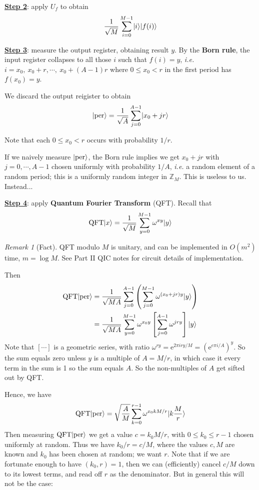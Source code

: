 \documentclass[]{article}
\DeclarePairedDelimiter\ket{\lvert}{\rangle}
\theoremstyle{custhm}
\theoremstyle{cusdef}
\theoremstyle{custhm}
\theoremstyle{custhm}
\theoremstyle{custhm}
\theoremstyle{custhm}
\theoremstyle{cusdef}
\theoremstyle{remark}
\newtheorem*{remark*}{Remark}
\newcommand{\Z}{\mathbb{Z}}
\newcommand{\e}{\mathrm{e}}
\newcommand{\ie}{\textit{i.e. }}
\newcommand{\QFT}{\textrm{QFT}}
\begin{document}
\underline{\textbf{Step 2}}: apply $U_f$ to obtain \[\frac{1}{\sqrt{M}}\sum_{i=0}^{M-1}\ket{i}\ket{f(i)}\]

\underline{\textbf{Step 3}}: measure the output register, obtaining result $y$. By the \textbf{Born rule}, the input register collapses to all those $i$ such that $f(i) = y$, \ie $i = x_0,\ x_0+r,\cdots,\ x_0+(A-1)r$ where $0\le x_0 < r$ in the first period has $f(x_0) = y$.

We discard the output reigister to obtain \[\ket{\textrm{per}} = \frac{1}{\sqrt{A}}\sum_{j=0}^{A-1}\ket{x_0+jr}\]

Note that each $0\le x_0 < r$ occurs with probability $1/r$.

If we naively measure $\ket{\textrm{per}}$, the Born rule implies we get $x_0 + jr$ with $j = 0,\cdots,A-1$ chosen uniformly with probability $1/A$, \ie a random element of a random period; this is a uniformly random integer in $\Z_M$. This is useless to us. Instead...

\underline{\textbf{Step 4}}: apply \textbf{Quantum Fourier Transform} (QFT).
Recall that
\[
\textrm{QFT}\ket{x} = \frac{1}{\sqrt{M}} \sum_{y=0}^{M-1} \omega^{xy} \ket{y}
\]
\begin{remark*}[Fact]
QFT modulo $M$ is unitary, and can be implemented in $O(m^2)$ time, $m = \log M$. See Part II QIC notes for circuit details of implementation.
\end{remark*}

Then
\begin{align*}
	\QFT\ket{\textrm{per}} &= \frac{1}{\sqrt{MA}}\sum_{j=0}^{A-1} \left(\sum_{j=0}^{M-1}\omega^{(x_0+jr)y}\ket{y}\right)\\
	&=\frac{1}{\sqrt{MA}}\sum_{y=0}^{M-1}\omega^{x_0y}\left[\sum_{j=0}^{A-1}\omega^{jry}\right]\ket{y}
\end{align*}
Note that $[\cdots]$ is a geometric series, with ratio $\omega^{ry} = \e^{2\pi iry/M} = \left(\e^{e\pi i/A}\right)^y$. So the sum equals zero unless $y$ is a multiple of $A = M/r$, in which case it every term in the sum is 1 so the sum equals $A$. So the non-multiples of $A$ get sifted out by QFT.

Hence, we have
\begin{align*}
\QFT\ket{\textrm{per}} = \sqrt{\frac{A}{M}}\sum_{k=0}^{r-1}\omega^{x_0kM/r}\ket{k\frac{M}{r}}
\end{align*}
Then measuring $\QFT\ket{\textrm{per}}$ we get a value $c = k_0 M/r$, with $0\le k_0\le r-1$ chosen uniformly at random. Thus we have $k_0/r = c/M$, where the values $c,M$ are known and $k_0$ has been chosen at random; we want $r$. Note that if we are fortunate enough to have $(k_0,r) = 1$, then we can (efficiently) cancel $c/M$ down to its lowest terms, and read off $r$ as the denominator. But in general this will not be the case:
\end{document}
